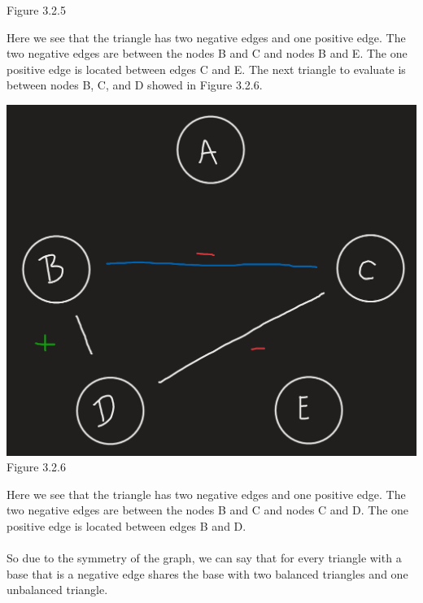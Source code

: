 \documentclass[11pt]{article}
\begin{document}
\begin{enumerate}
{\begin{center}
	Figure 3.2.5\\
\end{center}
Here we see that the triangle has two negative edges and one positive edge.  The two negative edges are between the nodes B and C and nodes B and E.  The one positive edge is located between edges C and E.  The next triangle to evaluate is between nodes B, C, and D showed in Figure 3.2.6.
\begin{center}
	\includegraphics[scale=0.5]{Figure_3_2_6}\\
	Figure 3.2.6\\
\end{center}
Here we see that the triangle has two negative edges and one positive edge.  The two negative edges are between the nodes B and C and nodes C and D.  The one positive edge is located between edges B and D.  \\\\
So due to the symmetry of the graph, we can say that for every triangle with a base that is a negative edge shares the base with two balanced triangles and one unbalanced triangle. 
}


\end{enumerate}
\end{document}
